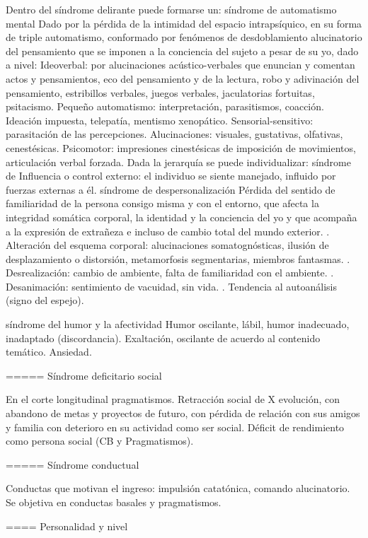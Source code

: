 \documentclass[encares.tex]{subfiles}
\begin{document}
Dentro del síndrome delirante puede formarse un: síndrome de automatismo mental Dado por la pérdida de la intimidad del espacio intrapsíquico, en su forma de triple automatismo, conformado por fenómenos de desdoblamiento alucinatorio del pensamiento que se imponen a la conciencia del sujeto a pesar de su yo, dado a nivel: Ideoverbal: por alucinaciones acústico-verbales que enuncian y comentan actos y pensamientos, eco del pensamiento y de la lectura, robo y adivinación del pensamiento, estribillos verbales, juegos verbales, jaculatorias fortuitas, psitacismo. Pequeño automatismo: interpretación, parasitismos, coacción. Ideación impuesta, telepatía, mentismo xenopático. Sensorial-sensitivo: parasitación de las percepciones. Alucinaciones: visuales, gustativas, olfativas, cenestésicas. Psicomotor: impresiones cinestésicas de imposición de movimientos, articulación verbal forzada. Dada la jerarquía se puede individualizar: síndrome de Influencia o control externo: el individuo se siente manejado, influido por fuerzas externas a él. síndrome de despersonalización Pérdida del sentido de familiaridad de la persona consigo misma y con el entorno, que afecta la integridad somática corporal, la identidad y la conciencia del yo y que acompaña a la expresión de extrañeza e incluso de cambio total del mundo exterior. . Alteración del esquema corporal: alucinaciones somatognósticas, ilusión de desplazamiento o distorsión, metamorfosis segmentarias, miembros fantasmas. . Desrealización: cambio de ambiente, falta de familiaridad con el ambiente. . Desanimación: sentimiento de vacuidad, sin vida. . Tendencia al autoanálisis (signo del espejo). 

síndrome del humor y la afectividad Humor oscilante, lábil, humor inadecuado, inadaptado (discordancia). Exaltación, oscilante de acuerdo al contenido temático. Ansiedad.

===== Síndrome deficitario social

En el corte longitudinal pragmatismos. Retracción social de X evolución, con abandono de metas y proyectos de futuro, con pérdida de relación con sus amigos y familia con deterioro en su actividad como ser social. Déficit de rendimiento como persona social (CB y Pragmatismos).

===== Síndrome conductual

Conductas que motivan el ingreso: impulsión catatónica, comando alucinatorio. Se objetiva en conductas basales y pragmatismos.

==== Personalidad y nivel
\end{document}
